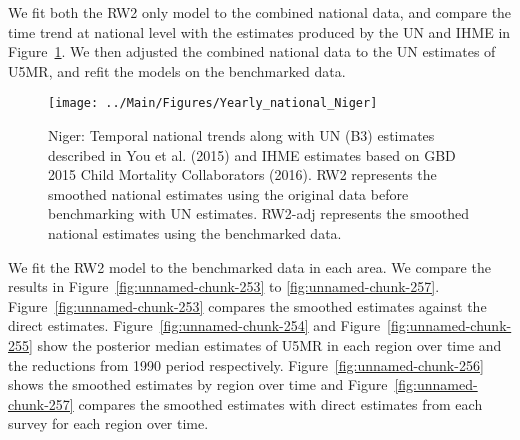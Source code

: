 \documentclass[12pt]{article}\usepackage[]{graphicx}\usepackage[]{color}
\newenvironment{knitrout}{}{} %
\begin{document}
We fit both the RW2 only model to the combined national data, and compare the time trend at national level with the estimates produced by the UN and IHME in Figure~\ref{fig:unnamed-chunk-252}. We then adjusted the combined national data to the UN estimates of U5MR, and refit the models on the benchmarked data. 

\begin{knitrout}
\color{fgcolor}\begin{figure}[bht]

{\centering \texttt{[image: ../Main/Figures/Yearly\_national\_Niger]} 

}

\caption[Niger]{Niger: Temporal national trends along with UN (B3) estimates described in You et al. (2015) and IHME estimates based on GBD 2015 Child Mortality Collaborators (2016). RW2 represents the smoothed national estimates using the original data before benchmarking with UN estimates. RW2-adj represents the smoothed national estimates using the benchmarked data.}\label{fig:unnamed-chunk-252}
\end{figure}


\end{knitrout}
 

We fit the RW2 model to the benchmarked data in each area. 
We compare the results in Figure~\ref{fig:unnamed-chunk-253} to \ref{fig:unnamed-chunk-257}.
Figure~\ref{fig:unnamed-chunk-253} compares the smoothed estimates against the direct estimates. Figure~\ref{fig:unnamed-chunk-254} and Figure~\ref{fig:unnamed-chunk-255} show the posterior median estimates of U5MR in each region over time and the reductions from 1990 period respectively.
Figure~\ref{fig:unnamed-chunk-256} shows the smoothed estimates by region over time and Figure~\ref{fig:unnamed-chunk-257} compares the smoothed estimates with direct estimates from each survey for each region over time.




\end{document}
